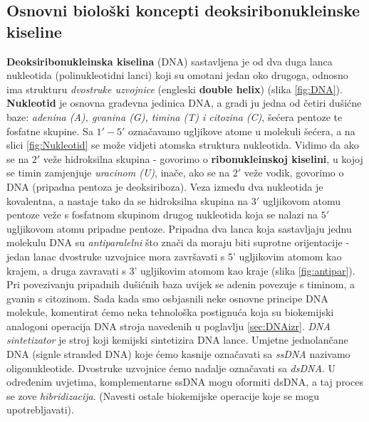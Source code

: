 \documentclass[a4paper,oneside,12pt]{memoir} %
\begin{document}
\begin{spacing}{1.5}
\section{Osnovni biološki koncepti deoksiribonukleinske kiseline}
\label{sec:DNA}
\textbf{Deoksiribonukleinska kiselina} (DNA) sastavljena je od dva duga lanca nukleotida (polinukleotidni lanci) koji su omotani jedan oko drugoga, odnosno ima strukturu \textit{dvostruke uzvojnice }(engleski \textbf{double helix}) (slika \ref{fig:DNA}). \textbf{Nukleotid} je osnovna građevna jedinica DNA, a gradi ju jedna od četiri dušićne baze: \textit{adenina (A), gvanina (G), timina (T) i citozina (C)}, šećera pentoze te fosfatne skupine. Sa $1' - 5'$ označavamo ugljikove atome u molekuli šećera, a na slici \ref{fig:Nukleotid} se može vidjeti atomska struktura nukleotida. Vidimo da ako se na $2'$ veže hidroksilna skupina - govorimo o \textbf{ribonukleinskoj kiselini}, u kojoj se timin zamjenjuje \textit{uracinom (U)}, inače, ako se na $2'$ veže vodik, govorimo o DNA (pripadna pentoza je deoksiriboza). Veza između dva nukleotida je kovalentna, a nastaje tako da se hidroksilna skupina na $3'$ ugljikovom atomu pentoze veže s fosfatnom skupinom drugog nukleotida koja se nalazi na $5'$ ugljikovom atomu pripadne pentoze. Pripadna dva lanca koja sastavljaju jednu molekulu DNA su \textit{antiparalelni} što znači da moraju biti suprotne orijentacije - jedan lanac dvostruke uzvojnice mora završavati s 5' ugljikovim atomom kao krajem, a druga zavravati s 3' ugljikovim atomom kao kraje (slika \ref{fig:antipar}). Pri povezivanju pripadnih dušićnih baza uvijek se adenin povezuje s timinom, a gvanin s citozinom. Sada kada smo osbjasnili neke osnovne principe DNA molekule, komentirat ćemo neka tehnološka postignuća koja su biokemijski analogoni operacija DNA stroja navedenih u poglavlju \ref{sec:DNAizr}.
\textit{DNA sintetizator} je stroj koji kemijski sintetizira DNA lance. Umjetne jednolančane DNA (signle stranded DNA) koje ćemo kasnije označavati sa \textit{ssDNA} nazivamo oligonukleotide. Dvostruke uzvojnice ćemo nadalje označavati sa \textit{dsDNA}. U određenim uvjetima, komplementarne ssDNA mogu oformiti dsDNA, a taj proces se zove \textit{hibridizacija}. (Navesti ostale biokemijske operacije koje se mogu upotrebljavati).


\end{spacing}
\end{document}
